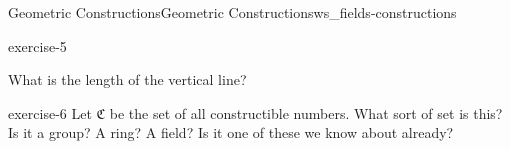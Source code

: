 \documentclass[oneside,11pt,]{article}
\begin{document}
\begin{worksheet-section-numberless}{Geometric Constructions}{}{Geometric Constructions}{}{}{ws_fields-constructions}
\begin{divisionexercise}{5}{}{}{exercise-5}
\begin{sidebyside}{1}{0.35}{0.35}{0}
\begin{sbspanel}{0.3}
{{}
}
\end{sbspanel}%
\end{sidebyside}%
\par
\hypertarget{p-15}{}%
What is the length of the vertical line?%
\end{divisionexercise}%
\begin{divisionexercise}{6}{}{}{exercise-6}%
\hypertarget{p-17}{}%
Let \(\mathfrak C\) be the set of all constructible numbers.  What sort of set is this?  Is it a group?  A ring?  A field?  Is it one of these we know about already?%
\end{divisionexercise}%
\end{worksheet-section-numberless}
\restoregeometry
\end{document}
